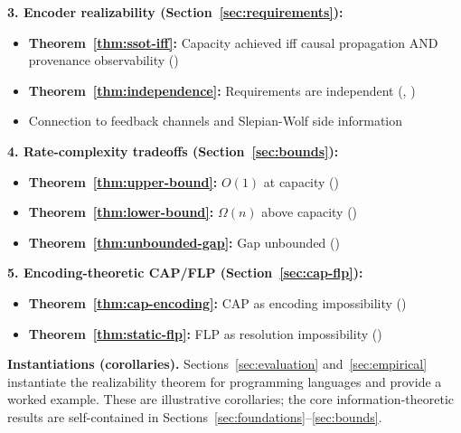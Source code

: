 \textbf{3. Encoder realizability (Section~\ref{sec:requirements}):}
\begin{itemize}
\tightlist
\item \textbf{Theorem~\ref{thm:ssot-iff}:} Capacity achieved iff causal propagation AND provenance observability ()
\item \textbf{Theorem~\ref{thm:independence}:} Requirements are independent (, )
\item Connection to feedback channels and Slepian-Wolf side information
\end{itemize}

\textbf{4. Rate-complexity tradeoffs (Section~\ref{sec:bounds}):}
\begin{itemize}
\tightlist
\item \textbf{Theorem~\ref{thm:upper-bound}:} $O(1)$ at capacity ()
\item \textbf{Theorem~\ref{thm:lower-bound}:} $\Omega(n)$ above capacity ()
\item \textbf{Theorem~\ref{thm:unbounded-gap}:} Gap unbounded ()
\end{itemize}

\textbf{5. Encoding-theoretic CAP/FLP (Section~\ref{sec:cap-flp}):}
\begin{itemize}
\tightlist
\item \textbf{Theorem~\ref{thm:cap-encoding}:} CAP as encoding impossibility ()
\item \textbf{Theorem~\ref{thm:static-flp}:} FLP as resolution impossibility ()
\end{itemize}

\textbf{Instantiations (corollaries).} Sections~\ref{sec:evaluation} and~\ref{sec:empirical} instantiate the realizability theorem for programming languages and provide a worked example. These are illustrative corollaries; the core information-theoretic results are self-contained in Sections~\ref{sec:foundations}--\ref{sec:bounds}.


